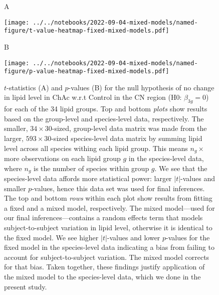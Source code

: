 \documentclass[letterpaper]{article}
\begin{document}
\begin{figure}[p]
	A

	\texttt{[image: ../../notebooks/2022-09-04-mixed-models/named-figure/t-value-heatmap-fixed-mixed-models.pdf]}

	B

	\texttt{[image: ../../notebooks/2022-09-04-mixed-models/named-figure/p-value-heatmap-fixed-mixed-models.pdf]}
	\caption[Comparing models and datasets in terms of $t$-statistics and
	$p$-values]{
	$t$-statistics (A) and $p$-values (B) for the null hypothesis of no change
	in lipid level in ChAc w.r.t Control in the CN region (H0: $\beta_{3g}=0$)
	for each of the 34 lipid groups.  Top and bottom \emph{plots} show results
	based on the group-level and species-level data, respectively.  The smaller,
	$34 \times 30$-sized, group-level data matrix was made from the larger, $593
	\times 30$-sized species-level data matrix by summing lipid level across all
	species withing each lipid group.  This means $n_g\times$ more observations
	on each lipid group $g$ in the species-level data, where $n_g$ is the number
	of species within group $g$.  We see that the species-level data affords
	more statistical power: larger $|t|$-values and smaller $p$-values, hence
	this data set was used for final inferences.  The top and bottom \emph{rows}
	within each plot show results from fitting a fixed and a mixed model,
	respectively.  The mixed model---used for our final inferences---contains a
	random effects term that models subject-to-subject variation in lipid level,
	otherwise it is identical to the fixed model.  We see higher $|t|$-values
	and lower $p$-values for the fixed model in the species-level data
	indicating a bias from failing to account for subject-to-subject variation.
	The mixed model corrects for that bias.  Taken together, these findings
	justify application of the mixed model to the species-level data, which we
	done in the present study.
}
\label{fig:t-value-heatmap}
\end{figure}

\end{document}
